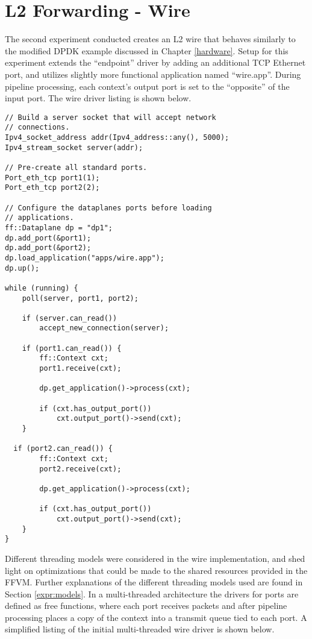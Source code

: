 \section{L2 Forwarding - Wire}
\label{expr:wire}
The second experiment conducted creates an L2 wire that behaves similarly
to the modified DPDK example discussed in Chapter \ref{hardware}. Setup for
this experiment extends the ``endpoint'' driver by adding an additional TCP
Ethernet port, and utilizes slightly more functional application named
``wire.app''. During pipeline processing, each context's output port is set
to the ``opposite'' of the input port. The wire driver listing is shown below.

\begin{lstlisting}
// Build a server socket that will accept network
// connections.
Ipv4_socket_address addr(Ipv4_address::any(), 5000);
Ipv4_stream_socket server(addr);

// Pre-create all standard ports.
Port_eth_tcp port1(1);
Port_eth_tcp port2(2);

// Configure the dataplanes ports before loading
// applications.
ff::Dataplane dp = "dp1";
dp.add_port(&port1);
dp.add_port(&port2);
dp.load_application("apps/wire.app");
dp.up();

while (running) {
	poll(server, port1, port2);

	if (server.can_read())
		accept_new_connection(server);

	if (port1.can_read()) {
		ff::Context cxt;
		port1.receive(cxt);

		dp.get_application()->process(cxt);

		if (cxt.has_output_port())
			cxt.output_port()->send(cxt);
	}

  if (port2.can_read()) {
		ff::Context cxt;
		port2.receive(cxt);

		dp.get_application()->process(cxt);

		if (cxt.has_output_port())
			cxt.output_port()->send(cxt);
	}
}
\end{lstlisting}

Different threading models were considered in the wire implementation, and shed
light on optimizations that could be made to the shared resources provided in
the FFVM. Further explanations of the different threading models used are found
in Section \ref{expr:models}. In a multi-threaded architecture the drivers for
ports are defined as free functions, where each port receives packets
and after pipeline processing places a copy of the context into a transmit queue
tied to each port. A simplified listing of the initial multi-threaded wire
driver is shown below.

